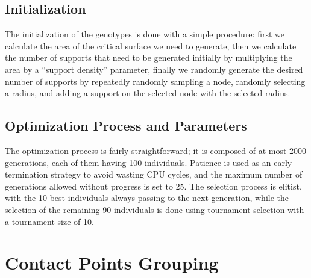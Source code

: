 \subsection{Initialization}
\label{sec:contact_points_opt_init}

The initialization of the genotypes is done with a simple procedure: first we calculate the area
of the critical surface we need to generate, then we calculate the number of supports that 
need to be generated initially by multiplying the area by a ``support density'' parameter,
finally we randomly generate the desired number of supports by repeatedly randomly
sampling a node, randomly selecting a radius, and adding a support on the selected node
with the selected radius.


\subsection{Optimization Process and Parameters}
\label{sec:contact_points_opt_par}

The optimization process is fairly straightforward; it is composed of at most 2000 generations,
each of them having 100 individuals. Patience is used as an early termination strategy to avoid wasting
CPU cycles, and the maximum number of generations allowed without progress is set to 25.
The selection process is elitist, with the 10 best individuals always passing to the next generation,
while the selection of the remaining 90 individuals is done using tournament selection with a 
tournament size of 10.



\section{Contact Points Grouping}
\label{sec:contact_points_grouping}

